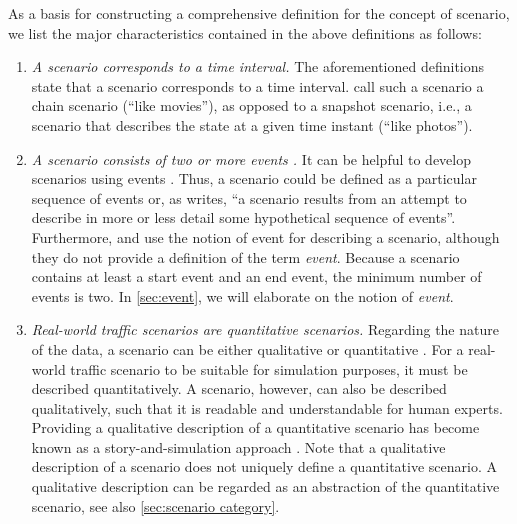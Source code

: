 \cstarte As a basis for constructing a comprehensive definition for the concept of scenario, we list the major characteristics contained in the above definitions as follows:\cende
\begin{enumerate}
	\item \textit{A scenario corresponds to a time interval.}
	The aforementioned definitions \autocite{go2004blind, geyer2014, ulbrich2015, elrofai2016scenario} state that a scenario corresponds to a time interval. \textcite{vannotten2003updated} call such a scenario a chain scenario (``like movies''), as opposed to a snapshot scenario, i.e., a scenario that describes the state at a given time instant (``like photos''). %

	\item \textit{A scenario consists of \cstartb two or more \cendb events \autocite{vannotten2003updated, go2004blind, geyer2014, ulbrich2015, kahn1962}.}
	It can be helpful to develop scenarios using events \autocite{bishop2007scentechniques}. Thus, a scenario could be defined as a particular sequence of events or, as \textcite[p.~143]{kahn1962} writes, ``a scenario results from an attempt to describe in more or less detail some hypothetical sequence of events''. Furthermore, \textcite{geyer2014} and \textcite{ulbrich2015} use the notion of event for describing a scenario, although they do not provide a definition of the term \emph{event}. 
	\cstartb Because a scenario contains at least a start event and an end event, the minimum number of events is two. \cendb
	In \cref{sec:event}, we will elaborate on the notion of \emph{event}.

	\item \textit{Real-world traffic scenarios are quantitative scenarios.}
	Regarding the nature of the data, a scenario can be either qualitative or quantitative \autocite{vannotten2003updated}. 
	\cstartd For a real-world traffic scenario to be suitable for simulation purposes, it must be described quantitatively. \cendd
	A scenario, however, can also be described qualitatively, such that it is readable and understandable for human experts. Providing a qualitative description of a quantitative scenario has become known as a story-and-simulation approach \autocite{alcamo2001scenarios}. 
	Note that a qualitative description of a scenario does not uniquely define a quantitative scenario. A qualitative description can be regarded as an abstraction of the quantitative scenario, see also \cref{sec:scenario category}.


\end{enumerate}
